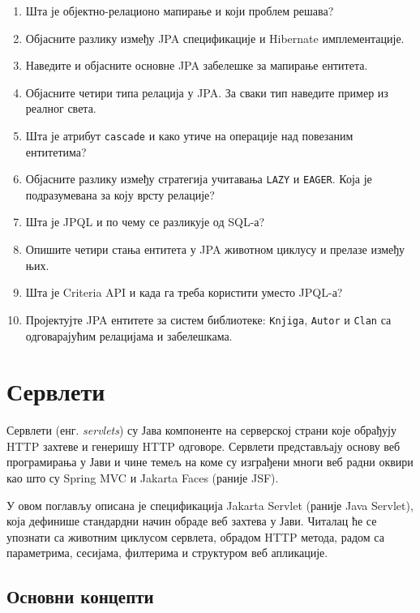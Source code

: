 \begin{enumerate}
\item Шта је објектно-релационо мапирање и који проблем решава?
\item Објасните разлику између JPA спецификације и Hibernate имплементације.
\item Наведите и објасните основне JPA забелешке за мапирање ентитета.
\item Објасните четири типа релација у JPA. За сваки тип наведите пример из реалног света.
\item Шта је атрибут \texttt{cascade} и како утиче на операције над повезаним ентитетима?
\item Објасните разлику између стратегија учитавања \texttt{LAZY} и \texttt{EAGER}. Која је подразумевана за коју врсту релације?
\item Шта је JPQL и по чему се разликује од SQL-а?
\item Опишите четири стања ентитета у JPA животном циклусу и прелазе између њих.
\item Шта је Criteria API и када га треба користити уместо JPQL-а?
\item Пројектујте JPA ентитете за систем библиотеке: \texttt{Knjiga}, \texttt{Autor} и \texttt{Clan} са одговарајућим релацијама и забелешкама.
\end{enumerate}



\setlength{\parindent}{15pt}
\setlength{\parskip}{0pt}
\chapter{Сервлети}

Сервлети (енг. \textit{servlets}) су Јава компоненте на серверској страни које обрађују HTTP захтеве и генеришу HTTP одговоре. Сервлети представљају основу веб програмирања у Јави и чине темељ на коме су изграђени многи веб радни оквири као што су Spring MVC и Jakarta Faces (раније JSF).

У овом поглављу описана је спецификација Jakarta Servlet (раније Java Servlet), која дефинише стандардни начин обраде веб захтева у Јави. Читалац ће се упознати са животним циклусом сервлета, обрадом HTTP метода, радом са параметрима, сесијама, филтерима и структуром веб апликације.


\section{Основни концепти}

